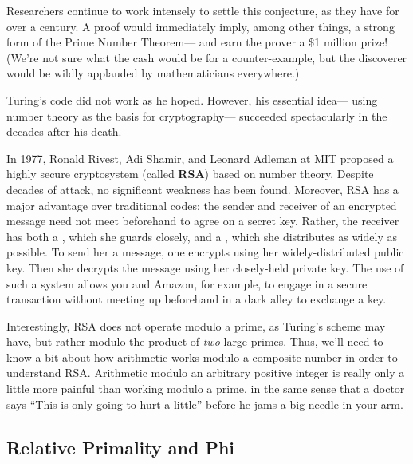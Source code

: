 {Researchers continue to work intensely to settle this conjecture, as they
have for over a century.  A proof would immediately imply, among other
things, a strong form of the Prime Number Theorem--- and earn the prover a
\$1 million prize!  (We're not sure what the cash would be for a
counter-example, but the discoverer would be wildly applauded by
mathematicians everywhere.)}

{}



Turing's code did not work as he hoped.  However, his essential
idea--- using number theory as the basis for cryptography--- succeeded
spectacularly in the decades after his death.

In 1977, Ronald Rivest, Adi Shamir, and Leonard Adleman at MIT proposed a
highly secure cryptosystem (called \textbf{RSA}) based on number theory.
Despite decades of attack, no significant weakness has been found.
Moreover, RSA has a major advantage over traditional codes: the sender and
receiver of an encrypted message need not meet beforehand to agree on a
secret key.  Rather, the receiver has both a , which she
guards closely, and a , which she distributes as widely
as possible.  To send her a message, one encrypts using her
widely-distributed public key.  Then she decrypts the message using her
closely-held private key.  The use of such a  system allows you and Amazon, for example, to engage in a
secure transaction without meeting up beforehand in a dark alley to
exchange a key.

Interestingly, RSA does not operate modulo a prime, as Turing's scheme
may have, but rather modulo the product of \textit{two} large primes.
Thus, we'll need to know a bit about how arithmetic works modulo a
composite number in order to understand RSA.  Arithmetic modulo an
arbitrary positive integer is really only a little more painful than
working modulo a prime, in the same sense that a doctor says ``This is
only going to hurt a little'' before he jams a big needle in your arm.

\subsection{Relative Primality and Phi}


